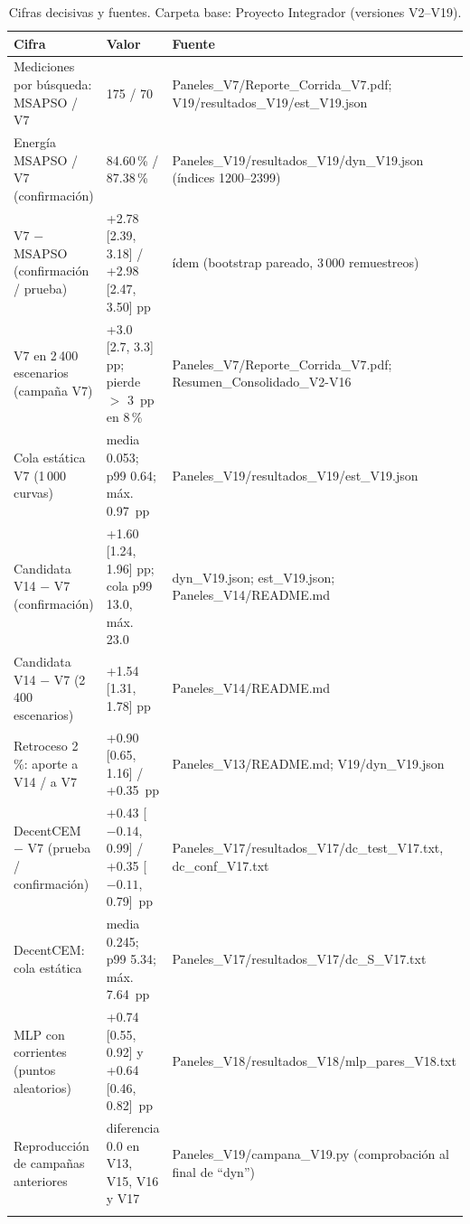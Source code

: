 \documentclass[letterpaper,11pt]{article}
\begin{document}
\begin{table}[H]
  \centering
  \caption{Cifras decisivas y fuentes. Carpeta base: Proyecto Integrador (versiones V2--V19).}
  \label{tab:cifras}
  \footnotesize
  \begin{tabularx}{\linewidth}{@{}p{4.3cm}p{4.0cm}L@{}}
    \toprule
    \textbf{Cifra} & \textbf{Valor} & \textbf{Fuente} \\
    \midrule
    Mediciones por búsqueda: MSAPSO / V7 & 175 / 70 & Paneles\_V7/Reporte\_Corrida\_V7.pdf; V19/resultados\_V19/est\_V19.json \\
    Energía MSAPSO / V7 (confirmación) & 84.60\,\% / 87.38\,\% & Paneles\_V19/resultados\_V19/dyn\_V19.json (índices 1200--2399) \\
    V7 $-$ MSAPSO (confirmación / prueba) & +2.78 [2.39, 3.18] / +2.98 [2.47, 3.50] pp & ídem (bootstrap pareado, 3\,000 remuestreos) \\
    V7 en 2\,400 escenarios (campaña V7) & +3.0 [2.7, 3.3] pp; pierde $>$ 3~pp en 8\,\% & Paneles\_V7/Reporte\_Corrida\_V7.pdf; Resumen\_Consolidado\_V2-V16 \\
    Cola estática V7 (1\,000 curvas) & media 0.053; p99 0.64; máx. 0.97~pp & Paneles\_V19/resultados\_V19/est\_V19.json \\
    Candidata V14 $-$ V7 (confirmación) & +1.60 [1.24, 1.96] pp; cola p99 13.0, máx. 23.0 & dyn\_V19.json; est\_V19.json; Paneles\_V14/README.md \\
    Candidata V14 $-$ V7 (2\,400 escenarios) & +1.54 [1.31, 1.78] pp & Paneles\_V14/README.md \\
    Retroceso 2\,\%: aporte a V14 / a V7 & +0.90 [0.65, 1.16] / +0.35~pp & Paneles\_V13/README.md; V19/dyn\_V19.json \\
    DecentCEM $-$ V7 (prueba / confirmación) & +0.43 [$-0.14$, 0.99] / +0.35 [$-0.11$, 0.79]~pp & Paneles\_V17/resultados\_V17/dc\_test\_V17.txt, dc\_conf\_V17.txt \\
    DecentCEM: cola estática & media 0.245; p99 5.34; máx. 7.64~pp & Paneles\_V17/resultados\_V17/dc\_S\_V17.txt \\
    MLP con corrientes (puntos aleatorios) & +0.74 [0.55, 0.92] y +0.64 [0.46, 0.82]~pp & Paneles\_V18/resultados\_V18/mlp\_pares\_V18.txt \\
    Reproducción de campañas anteriores & diferencia 0.0 en V13, V15, V16 y V17 & Paneles\_V19/campana\_V19.py (comprobación al final de ``dyn'') \\
    \addlinespace
     \\

\end{tabularx}
\end{table}
\end{document}
